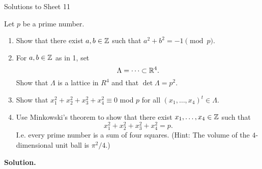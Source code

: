 \documentclass[a4paper,11pt]{article}
\begin{document}
\begin{center}
    \huge{Solutions to Sheet 11}
\end{center}

Let $p$ be a prime number.
\begin{enumerate}
    \item Show that there exist $a,b \in \mathbb{Z}$ such that $a^2 + b^2 = -1 \pmod p$.
    \item For $a,b \in \mathbb{Z}$ as in 1, set 
        \begin{equation*}
            \Lambda = \dots \subset \mathbb{R}^4.
        \end{equation*}
        Show that $\Lambda$ is a lattice in $R^4$ and that $\det \Lambda = p^2$. 
    \item Show that $x_1^2 + x_2^2 + x_3^2 + x_4^2 \equiv 0$ mod $p$ for all 
        $(x_1, \dots, x_4)^t \in \Lambda$. 
    \item Use Minkowski's theorem to show that there exist $x_1, \dots, x_4 \in \mathbb{Z}$ 
        such that \begin{equation*}
            x_1^2 + x_2^2 + x_3^2 + x_4^2 = p.
        \end{equation*}
        I.e. every prime number is a sum of four squares. (Hint: The volume of 
        the $4$-dimensional unit ball is $\pi^2 / 4$.)
\end{enumerate}
\textbf{Solution.}
\end{document}

